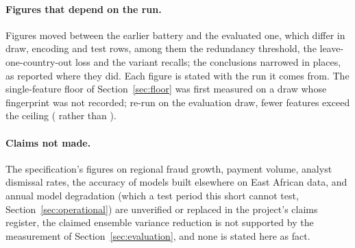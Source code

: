 \paragraph{Figures that depend on the run.} Figures moved between the earlier battery and the
evaluated one, which differ in draw, encoding and test rows, among them the redundancy threshold,
the leave-one-country-out loss and the variant recalls; the conclusions narrowed in places, as
reported where they did.
Each figure is stated with the run it comes from. The single-feature floor of
Section~\ref{sec:floor} was first measured on a draw whose fingerprint was not recorded; re-run on
the evaluation draw, fewer features exceed the ceiling (\nReAboveCeiling{} rather than
\nFeaturesAboveCeiling{}).

\paragraph{Claims not made.} The specification's figures on regional fraud growth, payment volume,
analyst dismissal rates, the accuracy of models built elsewhere on East African data, and annual model
degradation (which a test period this short cannot test, Section~\ref{sec:operational}) are unverified or replaced in the project's claims register, the claimed ensemble
variance reduction is not supported by the measurement of Section~\ref{sec:evaluation}, and none is
stated here as fact.
